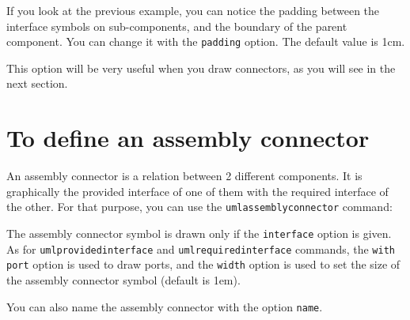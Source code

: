 \documentclass[a4paper,11pt]{report}
\begin{document}
\medskip

If you look at the previous example, you can notice the padding between the interface symbols on sub-components, and the boundary of the parent component. You can change it with the {\tt padding} option. The default value is 1cm.

\medskip

\begin{minipage}{0.45\textwidth}
	
\end{minipage}
\begin{minipage}{0.55\textwidth}
	\begin{center}
	\end{center}
\end{minipage}

\medskip

This option will be very useful when you draw connectors, as you will see in the next section.

\section{To define an assembly connector}

An assembly connector is a relation between 2 different components. It is graphically the provided interface of one of them with the required interface of the other.
For that purpose, you can use the {\tt umlassemblyconnector} command:

\medskip

\begin{minipage}{0.45\textwidth}
	
\end{minipage}
\begin{minipage}{0.55\textwidth}
	\begin{center}
	\end{center}
\end{minipage}

\medskip

The assembly connector symbol is drawn only if the {\tt interface} option is given. As for {\tt umlprovidedinterface} and {\tt umlrequiredinterface} commands, the {\tt with port} option is used to draw ports, and the {\tt width} option is used to set the size of the assembly connector symbol (default is 1em).

You can also name the assembly connector with the option {\tt name}.
\end{document}
